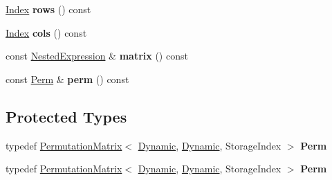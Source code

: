 \begin{DoxyCompactItemize}
\hyperlink{group___core___module_a554f30542cc2316add4b1ea0a492ff02}{Index} {\bfseries rows} () const
\item 
\mbox{\label{class_eigen_1_1_sparse_symmetric_permutation_product_aaa3e6f4ec6b0b6e7d5ddd6b90fb315cf}} 
\hyperlink{group___core___module_a554f30542cc2316add4b1ea0a492ff02}{Index} {\bfseries cols} () const
\item 
\mbox{\label{class_eigen_1_1_sparse_symmetric_permutation_product_a4e413e198db04775095f311b387fb115}} 
const \hyperlink{group___sparse_core___module}{Nested\+Expression} \& {\bfseries matrix} () const
\item 
\mbox{\label{class_eigen_1_1_sparse_symmetric_permutation_product_a3b40313534a1f298e47bf4619891cd5f}} 
const \hyperlink{group___core___module}{Perm} \& {\bfseries perm} () const
\end{DoxyCompactItemize}
\subsection*{Protected Types}
\begin{DoxyCompactItemize}
\item 
\mbox{\label{class_eigen_1_1_sparse_symmetric_permutation_product_a7070c16aa9488b03a2e86a93c8d32117}} 
typedef \hyperlink{group___core___module_class_eigen_1_1_permutation_matrix}{Permutation\+Matrix}$<$ \hyperlink{namespace_eigen_ad81fa7195215a0ce30017dfac309f0b2}{Dynamic}, \hyperlink{namespace_eigen_ad81fa7195215a0ce30017dfac309f0b2}{Dynamic}, Storage\+Index $>$ {\bfseries Perm}
\item 
\mbox{\label{class_eigen_1_1_sparse_symmetric_permutation_product_a7070c16aa9488b03a2e86a93c8d32117}} 
typedef \hyperlink{group___core___module_class_eigen_1_1_permutation_matrix}{Permutation\+Matrix}$<$ \hyperlink{namespace_eigen_ad81fa7195215a0ce30017dfac309f0b2}{Dynamic}, \hyperlink{namespace_eigen_ad81fa7195215a0ce30017dfac309f0b2}{Dynamic}, Storage\+Index $>$ {\bfseries Perm}
\end{DoxyCompactItemize}
